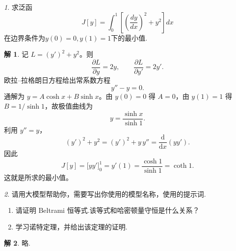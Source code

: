 \documentclass[11pt]{article}
\theoremstyle{remark}
\newtheorem{problem}{}
\theoremstyle{definition}
\newtheorem{solution}{解}
\begin{document}
\begin{problem}
  求泛函
  $$
  J[y] = \int_0^1 \left[ \left(\frac{dy}{dx}\right)^2 + y^2 \right] dx
  $$
  在边界条件为$y(0) = 0, y(1) = 1$下的最小值.
\end{problem}

\begin{solution}
记 $L=(y')^2+y^2$。则
\[
\frac{\partial L}{\partial y}=2y,
\qquad
\frac{\partial L}{\partial y'}=2y'.
\]
欧拉--拉格朗日方程给出常系数方程
\[
y''-y=0.
\]
通解为 $y=A\cosh x+B\sinh x$。由 $y(0)=0$ 得 $A=0$，由 $y(1)=1$ 得 $B=1/\sinh 1$，故极值曲线为
\[
y=\frac{\sinh x}{\sinh 1}.
\]
利用 $y''=y$，
\[
(y')^2+y^2=(y')^2+y\,y''=\frac{\mathrm{d}}{\mathrm{d}x}(yy').
\]
因此
\[
J[y]=\bigl[yy'\bigr]_0^1=y'(1)=\frac{\cosh 1}{\sinh 1}=\coth 1.
\]
这就是所求的最小值。
\end{solution}

\begin{problem}
  请用大模型帮助你，需要写出你使用的模型名称，使用的提示词.
  \begin{enumerate}
    \item 请证明 Beltrami 恒等式.该等式和哈密顿量守恒是什么关系？
    \item 学习诺特定理，并给出该定理的证明.
  \end{enumerate}
\end{problem}

\begin{solution}
略.
\end{solution}
\end{document}
